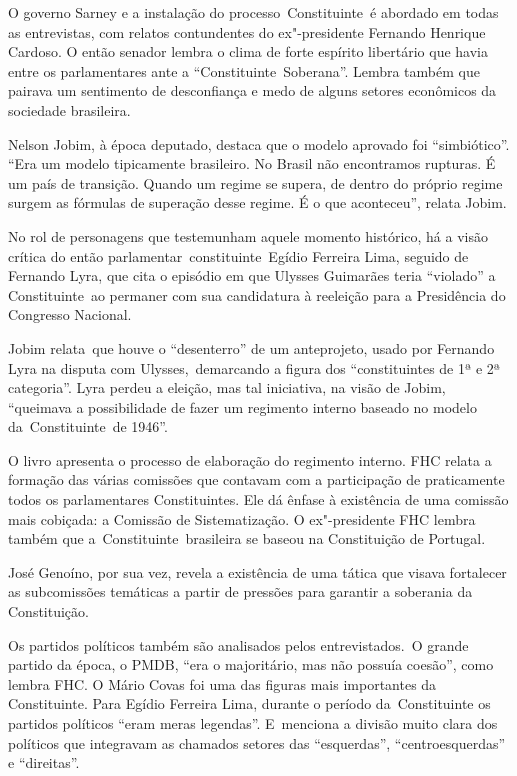 O governo Sarney e a instalação do processo~Constituinte~é abordado em
todas as entrevistas, com relatos contundentes do ex"-presidente Fernando
Henrique Cardoso. O então senador lembra o clima de forte espírito
libertário que havia entre os parlamentares ante a
``Constituinte~Soberana''. Lembra também que pairava um sentimento de
desconfiança e medo de alguns setores econômicos da sociedade
brasileira.

Nelson Jobim, à época deputado, destaca que o modelo aprovado foi
``simbiótico''. ``Era um modelo tipicamente brasileiro. No Brasil não
encontramos rupturas. É um país de transição. Quando um regime se
supera, de dentro do próprio regime surgem as fórmulas de superação
desse regime. É o que aconteceu'', relata Jobim.

No rol de personagens que testemunham aquele momento histórico, há a
visão crítica do então parlamentar~constituinte~Egídio Ferreira Lima,
seguido de Fernando Lyra, que cita o episódio em que Ulysses Guimarães
teria ``violado'' a Constituinte~ao permaner com sua candidatura à
reeleição para a Presidência do Congresso Nacional.

Jobim relata~que houve o ``desenterro'' de um anteprojeto, usado por
Fernando Lyra na disputa com Ulysses,~demarcando a figura dos
``constituintes de 1ª e 2ª categoria''. Lyra perdeu a eleição, mas tal
iniciativa, na visão de Jobim, ``queimava a possibilidade de fazer um
regimento interno baseado no modelo da~Constituinte~de 1946''.

O livro apresenta o processo de elaboração do regimento interno. FHC
relata a formação das várias comissões que contavam com a participação
de praticamente todos os parlamentares Constituintes. Ele dá ênfase à
existência de uma comissão mais cobiçada: a Comissão de Sistematização.
O ex"-presidente FHC lembra também que a~Constituinte~brasileira se
baseou na Constituição de Portugal.

José Genoíno, por sua vez, revela a existência de uma tática que visava
fortalecer as subcomissões temáticas a partir de pressões para garantir
a soberania da Constituição.

Os partidos políticos também são analisados pelos entrevistados.~O
grande partido da época, o PMDB, ``era o majoritário, mas não possuía
coesão'', como lembra FHC. O Mário Covas foi uma das figuras mais
importantes da Constituinte. Para Egídio Ferreira Lima, durante o
período da~Constituinte os partidos políticos ``eram meras legendas''.
E~menciona a divisão muito clara dos políticos que integravam as
chamados setores das ``esquerdas'', ``centroesquerdas'' e ``direitas''.~

